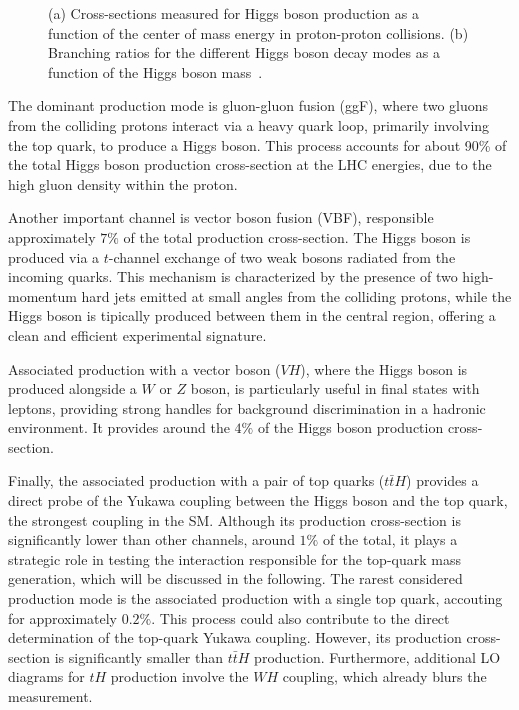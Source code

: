 \begin{figure}[htbp]
    \caption{(a) Cross-sections measured for Higgs boson production as a function of the center of mass energy in proton-proton collisions. (b) Branching ratios for the different Higgs boson decay modes as a function of the Higgs boson mass~\cite{Nature_ATLAS}.}    \label{fig:higgs_comb}
\end{figure}



The dominant production mode is gluon-gluon fusion (ggF), where two gluons from the colliding protons interact via a heavy quark loop, primarily involving the top quark, to produce a Higgs boson. This process accounts for about 90\% of the total Higgs boson production cross-section at the LHC energies, due to the high gluon density within the proton.

Another important channel is vector boson fusion (VBF), responsible approximately $7\%$ of the total production cross-section. The Higgs boson is produced via a $t$-channel exchange of two weak bosons radiated from the incoming quarks. This mechanism is characterized by the presence of two high-momentum hard jets emitted at small angles from the colliding protons, while the Higgs boson is tipically produced between them in the central region, offering a clean and efficient experimental signature. 

Associated production with a vector boson ($VH$), where the Higgs boson is produced alongside a $W$ or $Z$ boson, is particularly useful in final states with leptons, providing strong handles for background discrimination in a hadronic environment. It provides around the $4\%$ of the Higgs boson production cross-section.

Finally, the associated production with a pair of top quarks ($t\bar{t}H$) provides a direct probe of the Yukawa coupling between the Higgs boson and the top quark, the strongest coupling in the SM. Although its production cross-section is significantly lower than other channels, around $1\%$ of the total, it plays a strategic role in testing the interaction responsible for the top-quark mass generation, which will be discussed in the following.
The rarest considered production mode is the associated production with a single top quark, accouting for approximately $0.2\%$. This process could also contribute to the direct determination of the top-quark Yukawa coupling. However, its production cross-section is significantly smaller than \( t\bar{t}H \) production. Furthermore, additional LO diagrams for $tH$ production involve the $WH$ coupling, which already blurs the measurement.

